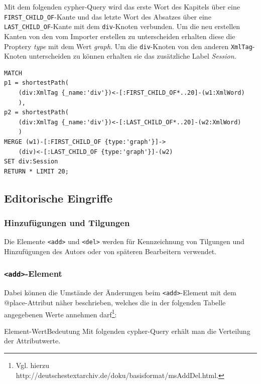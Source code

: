 Mit dem folgenden cypher-Query wird das erste Wort des Kapitels über
eine \texttt{FIRST\_CHILD\_OF}-Kante und das letzte Wort des Absatzes
über eine \texttt{LAST\_CHILD\_OF}-Kante mit dem \texttt{div}-Knoten
verbunden. Um die neu erstellen Kanten von den vom Importer erstellen zu
unterscheiden erhalten diese die Proptery \emph{type} mit dem Wert
\emph{graph}. Um die \texttt{div}-Knoten von den anderen
\texttt{XmlTag}-Knoten unterscheiden zu können erhalten sie das
zusätzliche Label \emph{Session}.

\begin{verbatim}
MATCH
p1 = shortestPath(
    (div:XmlTag {_name:'div'})<-[:FIRST_CHILD_OF*..20]-(w1:XmlWord)
    ),
p2 = shortestPath(
    (div:XmlTag {_name:'div'})<-[:LAST_CHILD_OF*..20]-(w2:XmlWord)
    )
MERGE (w1)-[:FIRST_CHILD_OF {type:'graph'}]->
    (div)<-[:LAST_CHILD_OF {type:'graph'}]-(w2)
SET div:Session
RETURN * LIMIT 20;
\end{verbatim}

\hypertarget{editorische-eingriffe}{%
\subsection{Editorische Eingriffe}\label{editorische-eingriffe}}

\hypertarget{hinzufuxfcgungen-und-tilgungen}{%
\subsubsection{Hinzufügungen und
Tilgungen}\label{hinzufuxfcgungen-und-tilgungen}}

Die Elemente \texttt{\textless{}add\textgreater{}} und
\texttt{\textless{}del\textgreater{}} werden für Kennzeichnung von
Tilgungen und Hinzufügungen des Autors oder von späteren Bearbeitern
verwendet.

\hypertarget{add-element}{%
\subsubsection{\texorpdfstring{\texttt{\textless{}add\textgreater{}}-Element}{\textless add\textgreater-Element}}\label{add-element}}

Dabei können die Umstände der Änderungen beim
\texttt{\textless{}add\textgreater{}}-Element mit dem @place-Attribut
näher beschrieben, welches die in der folgenden Tabelle angegebenen
Werte annehmen darf\footnote{Vgl. hierzu
  http://deutschestextarchiv.de/doku/basisformat/msAddDel.html.}:

\textbar Element\textbar@place-Wert\textbar Bedeutung Mit folgenden
cypher-Query erhält man die Verteilung der Attributwerte.

